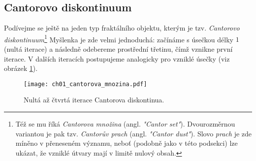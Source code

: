 \subsection{Cantorovo diskontinuum}\label{subsec:cantorovo_diskontinuum}
Podívejme se ještě na jeden typ fraktálního objektu, kterým je tzv. \emph{Cantorovo diskontinuum}\footnote{Též se mu říká \emph{Cantorova množina} (angl. \emph{"Cantor set"}). Dvourozměrnou variantou je pak tzv. \emph{Cantorův prach} (angl. \emph{"Cantor dust"}). Slovo \emph{prach} je zde míněno v přeneseném významu, neboť (podobně jako v této podsekci) lze ukázat, že vzniklé útvary mají v limitě nulový obsah.} Myšlenka je zde velmi jednoduchá: začínáme s úsečkou délky $1$ (nultá iterace) a následně odebereme prostřední třetinu, čímž vznikne první iterace. V dalších iteracích postupujeme analogicky pro vzniklé úsečky (viz obrázek \ref{fig:cantorovo_diskontinuum}).
\begin{figure}[h]
    \centering
    \texttt{[image: ch01\_cantorova\_mnozina.pdf]}
    \caption{Nultá až čtvrtá iterace Cantorova diskontinua.}
    \label{fig:cantorovo_diskontinuum}
\end{figure}

